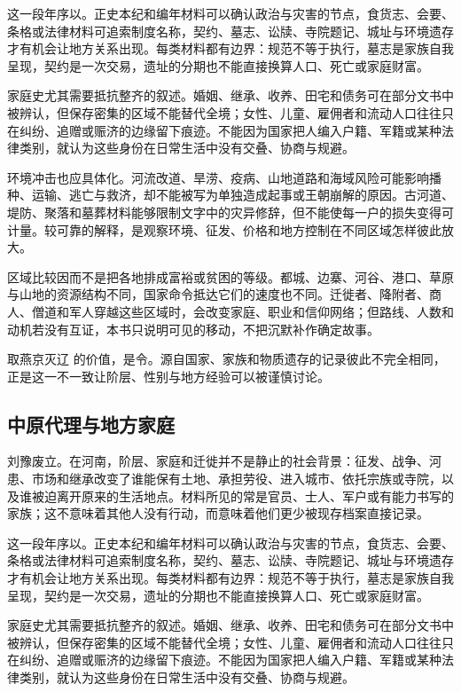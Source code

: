 这一段年序以。正史本纪和编年材料可以确认政治与灾害的节点，食货志、会要、条格或法律材料可追索制度名称，契约、墓志、讼牍、寺院题记、城址与环境遗存才有机会让地方关系出现。每类材料都有边界：规范不等于执行，墓志是家族自我呈现，契约是一次交易，遗址的分期也不能直接换算人口、死亡或家庭财富。

家庭史尤其需要抵抗整齐的叙述。婚姻、继承、收养、田宅和债务可在部分文书中被辨认，但保存密集的区域不能替代全境；女性、儿童、雇佣者和流动人口往往只在纠纷、追赠或赈济的边缘留下痕迹。不能因为国家把人编入户籍、军籍或某种法律类别，就认为这些身份在日常生活中没有交叠、协商与规避。

环境冲击也应具体化。河流改道、旱涝、疫病、山地道路和海域风险可能影响播种、运输、逃亡与救济，却不能被写为单独造成起事或王朝崩解的原因。古河道、堤防、聚落和墓葬材料能够限制文字中的灾异修辞，但不能使每一户的损失变得可计量。较可靠的解释，是观察环境、征发、价格和地方控制在不同区域怎样彼此放大。

区域比较因而不是把各地排成富裕或贫困的等级。都城、边寨、河谷、港口、草原与山地的资源结构不同，国家命令抵达它们的速度也不同。迁徙者、降附者、商人、僧道和军人穿越这些区域时，会改变家庭、职业和信仰网络；但路线、人数和动机若没有互证，本书只说明可见的移动，不把沉默补作确定故事。

取燕京灭辽 的价值，是令。源自国家、家族和物质遗存的记录彼此不完全相同，正是这一不一致让阶层、性别与地方经验可以被谨慎讨论。

\subsection{中原代理与地方家庭}

刘豫废立。在河南，阶层、家庭和迁徙并不是静止的社会背景：征发、战争、河患、市场和继承改变了谁能保有土地、承担劳役、进入城市、依托宗族或寺院，以及谁被迫离开原来的生活地点。材料所见的常是官员、士人、军户或有能力书写的家族；这不意味着其他人没有行动，而意味着他们更少被现存档案直接记录。

这一段年序以。正史本纪和编年材料可以确认政治与灾害的节点，食货志、会要、条格或法律材料可追索制度名称，契约、墓志、讼牍、寺院题记、城址与环境遗存才有机会让地方关系出现。每类材料都有边界：规范不等于执行，墓志是家族自我呈现，契约是一次交易，遗址的分期也不能直接换算人口、死亡或家庭财富。

家庭史尤其需要抵抗整齐的叙述。婚姻、继承、收养、田宅和债务可在部分文书中被辨认，但保存密集的区域不能替代全境；女性、儿童、雇佣者和流动人口往往只在纠纷、追赠或赈济的边缘留下痕迹。不能因为国家把人编入户籍、军籍或某种法律类别，就认为这些身份在日常生活中没有交叠、协商与规避。

